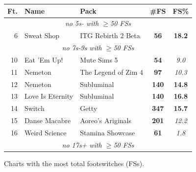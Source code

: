\documentclass[10pt]{sigplanconf}
\begin{document}
\begin{figure}[t]
	\begin{center}
		\small
	\begin{tabular}{r|l|l|c|c}
		\bf Ft. & \bf Name & \bf Pack & \bf \#FS & \bf FS\% \\
		\hline
		\multicolumn{5}{c}{\em no 5s- with $\ge$50 FSs} \\
		 6 & Sweat Shop       & ITG Rebirth 2 Beta    & \bf  56 & \bf 18.2 \\
		\multicolumn{5}{c}{\em no 7s-9s with $\ge$50 FSs} \\
		10 & Eat 'Em Up!      & Mute Sims 5           & \bf  54 & \em  9.0 \\
		11 & Nemeton          & The Legend of Zim 4   & \bf  97 & \em 10.3 \\
		12 & Nemeton          & Subluminal            & \bf 140 & \bf 14.8 \\
		13 & Love Is Eternity & Subluminal            & \bf 140 & \bf 16.8 \\
		14 & Switch           & Getty                 & \bf 347 & \bf 15.7 \\
		15 & Danse Macabre    & Aoreo's Ariginals     & \bf 201 & \em 12.2 \\
		16 & Weird Science    & Stamina Showcase      & \bf  61 & \em  1.8 \\
		\multicolumn{5}{c}{\em no 17s+ with $\ge$50 FSs} \\
	\end{tabular}
	\end{center}
	\caption{Charts with the most total footswitches (FSs).}
\end{figure}
\end{document}
